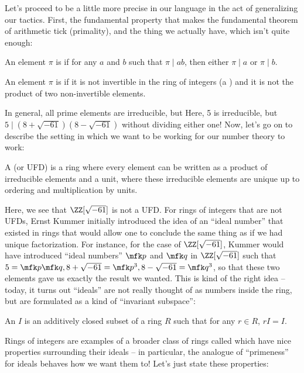 \documentclass[12pt]{article}
\begin{document}
Let's proceed to be a little more precise in our language in the act of
generalizing our tactics. First, the fundamental property that
makes the fundamental theorem of arithmetic tick (primality), and the 
thing we actually have, which isn't quite enough: 
\begin{definition*}
  An element $\pi$ is  if for any $a$ and $b$ such that $\pi \mid a
  b$, then either $\pi \mid a$ or $\pi \mid b$. 
\end{definition*}    
\begin{definition*}
  An element $\pi$ is  if it is not invertible in the ring of
  integers (a ) and it is not the product of two non-invertible
  elements.      
\end{definition*}
\noindent In general, all prime elements are irreducible, but  Here, 5 is irreducible, but $5 \mid (8 +
\sqrt{-61})(8 - \sqrt{-61})$ without dividing either one! Now, let's go on to describe the setting in which we want to be working for our number theory to work: 
\begin{definition*}
  A  (or UFD) is a ring where every
  element can be written as a product of irreducible elements and a unit, where
  these irreducible elements are unique up to ordering and multiplication by
  units. 
\end{definition*}
Here, we see that $\ZZ[\sqrt{-61}]$ is not a UFD.
For rings of integers that are not UFDs, Ernst Kummer initially introduced the
idea of an ``ideal number'' that existed in rings that would allow one to
conclude the same thing as if we had unique factorization. For instance,
for the case of $\ZZ[\sqrt{-61}]$, Kummer would have introduced ``ideal
numbers'' $\mfk p$ and $\mfk q$ in $\ZZ[\sqrt{-61}]$ 
such that $5 = \mfk p \mfk q, 8 + \sqrt{-61} = \mfk p^3, 8 - \sqrt{-61} =
\mfk q^3$, so that these two elements gave us exactly the result we wanted. 
This is kind of the right idea -- today, it turns out ``ideals'' are not really
thought of as numbers inside the ring, but are formulated as a kind of ``invariant subspace'':
\begin{definition*}
  An  $I$ is an additively closed subset of a ring $R$ such that
  for any $r \in R$, $rI = I$. 
\end{definition*}
Rings of integers are examples of a broader class of rings called
 which
have nice properties surrounding their ideals -- in particular, the analogue of
``primeness'' for ideals behaves how we want them to! Let's just state these properties: 
\end{document}
